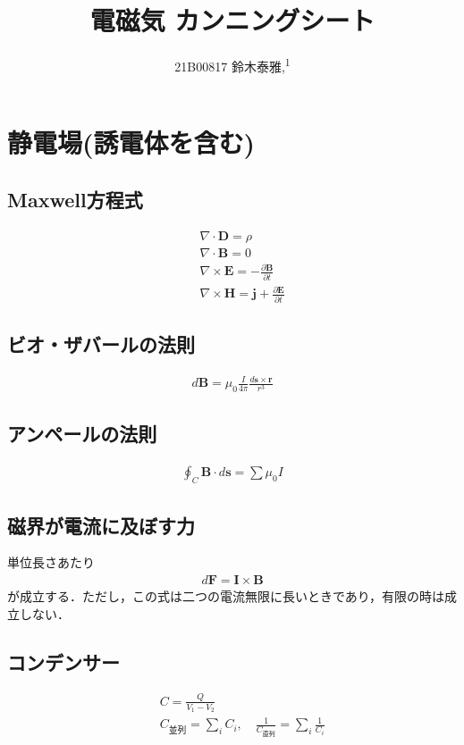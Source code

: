 \documentclass[12pt,dvipdfmx]{jsarticle}
\newcommand\authormark[1]{\textsuperscript{#1}}
\begin{document}
\title{電磁気 カンニングシート}

\author{21B00817 鈴木泰雅,\authormark{1}}
\section*{\Large{静電場(誘電体を含む)}}
\subsection*{\large{Maxwell方程式}}
\begin{eqnarray}
  &&\nabla\cdot \bm{D} = \rho\\
  &&\nabla\cdot\bm{B}=0\\
  &&\nabla\times \bm{E} = -\frac{\partial \bm{B}}{\partial t}\\
  &&\nabla\times \bm{H} = \bm{j} + \frac{\partial\bm{E}}{\partial t}
\end{eqnarray}
\subsection*{\large{ビオ・ザバールの法則}}
\begin{eqnarray}
  d\bm{B} = \mu_0 \frac{I}{4\pi}\frac{d\bm{s}\times \bm{r}}{r^3}
\end{eqnarray}
\subsection*{\large{アンペールの法則}}
\begin{eqnarray}
  \oint_C \bm{B}\cdot d\bm{s} = \sum \mu_0 I
\end{eqnarray}
\subsection*{\large{磁界が電流に及ぼす力}}
単位長さあたり
\begin{eqnarray}
  d\bm{F}=\bm{I}\times\bm{B}
\end{eqnarray}
が成立する．ただし，この式は二つの電流無限に長いときであり，有限の時は成立しない．


\subsection*{\large{コンデンサー}}
\begin{eqnarray}
  &&C= \frac{Q}{V_1-V_2}\\
  &&C_{並列} = \sum_i C_i,\quad \frac{1}{C_{直列}} = \sum_i \frac{1}{C_i}
\end{eqnarray}
\end{document}

